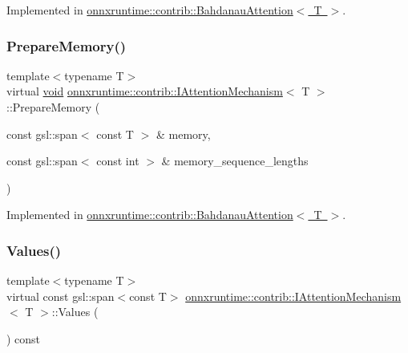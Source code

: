 Implemented in \mbox{\hyperlink{classonnxruntime_1_1contrib_1_1BahdanauAttention_a1c21100a19fdbf8596cfffbe3db84661}{onnxruntime\+::contrib\+::\+Bahdanau\+Attention$<$ T $>$}}.

\mbox{\label{classonnxruntime_1_1contrib_1_1IAttentionMechanism_a9b56c5b71af342077b483c762fc2e724}} 
\subsubsection{\texorpdfstring{Prepare\+Memory()}{PrepareMemory()}}
{\footnotesize\ttfamily template$<$typename T$>$ \\
virtual \mbox{\hyperlink{mlasi_8h_a88f941d423cb2a819b70a1358982b1a6}{void}} \mbox{\hyperlink{classonnxruntime_1_1contrib_1_1IAttentionMechanism}{onnxruntime\+::contrib\+::\+I\+Attention\+Mechanism}}$<$ T $>$\+::Prepare\+Memory (\begin{DoxyParamCaption}\item[{const gsl\+::span$<$ const T $>$ \&}]{memory,  }\item[{const gsl\+::span$<$ const int $>$ \&}]{memory\+\_\+sequence\+\_\+lengths }\end{DoxyParamCaption})\hspace{0.3cm}{\ttfamily [pure virtual]}}



Implemented in \mbox{\hyperlink{classonnxruntime_1_1contrib_1_1BahdanauAttention_a085f7b9b141b95925abab3a5fffbb31f}{onnxruntime\+::contrib\+::\+Bahdanau\+Attention$<$ T $>$}}.

\mbox{\label{classonnxruntime_1_1contrib_1_1IAttentionMechanism_a74f8db1c6302b52dfea595c230ce6a69}} 
\subsubsection{\texorpdfstring{Values()}{Values()}}
{\footnotesize\ttfamily template$<$typename T$>$ \\
virtual const gsl\+::span$<$const T$>$ \mbox{\hyperlink{classonnxruntime_1_1contrib_1_1IAttentionMechanism}{onnxruntime\+::contrib\+::\+I\+Attention\+Mechanism}}$<$ T $>$\+::Values (\begin{DoxyParamCaption}{ }\end{DoxyParamCaption}) const\hspace{0.3cm}{\ttfamily [pure virtual]}}



